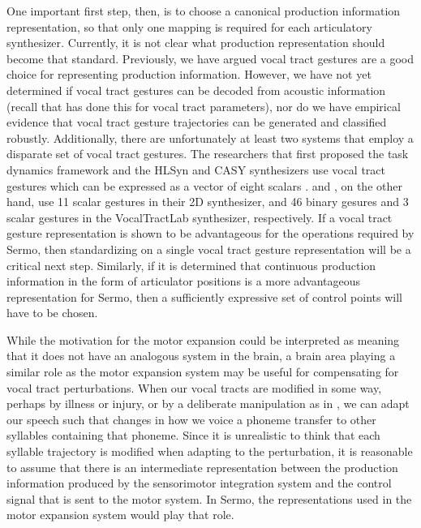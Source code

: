 One important first step, then,
is to choose a canonical
production information representation,
so that only one mapping is required
for each articulatory synthesizer.
Currently, it is not clear
what production representation
should become that standard.
Previously, we have argued
vocal tract gestures are a
good choice for representing production information.
However, we have not yet determined
if vocal tract gestures can be decoded
from acoustic information
(recall that \citealt{uria2011}
has done this for vocal tract parameters),
nor do we have empirical evidence
that vocal tract gesture trajectories
can be generated and classified robustly.
Additionally, there are unfortunately
at least two systems that employ
a disparate set of vocal tract gestures.
The researchers that first proposed
the task dynamics framework
and the HLSyn \citep{hanson1999}
and CASY synthesizers \citep{iskarous2003}
use vocal tract gestures
which can be expressed
as a vector of eight scalars
\citep{zhuang2008,zhuang2009}.
\citet{kroger2014} and \citet{birkholz2006,birkholz2013},
on the other hand,
use 11 scalar gestures in their 2D synthesizer,
and 46 binary gesures and 3 scalar gestures
in the VocalTractLab synthesizer,
respectively.
If a vocal tract gesture representation
is shown to be advantageous
for the operations required by Sermo,
then standardizing on a single
vocal tract gesture representation
will be a critical next step.
Similarly,
if it is determined that
continuous production information
in the form of articulator positions
is a more advantageous representation
for Sermo,
then a sufficiently expressive
set of control points
will have to be chosen.

While the motivation for the
motor expansion could be interpreted
as meaning that it does not
have an analogous system in the brain,
a brain area playing a similar role
as the motor expansion system
may be useful for
compensating for vocal tract perturbations.
When our vocal tracts are modified in some way,
perhaps by illness or injury,
or by a deliberate manipulation
as in \citet{houde1998},
we can adapt our speech
such that changes in how we voice a phoneme
transfer to other syllables containing that phoneme.
Since it is unrealistic to think that
each syllable trajectory is modified
when adapting to the perturbation,
it is reasonable to assume that
there is an intermediate representation
between the production information
produced by the sensorimotor integration system
and the control signal that is sent
to the motor system.
In Sermo, the representations used
in the motor expansion system
would play that role.

